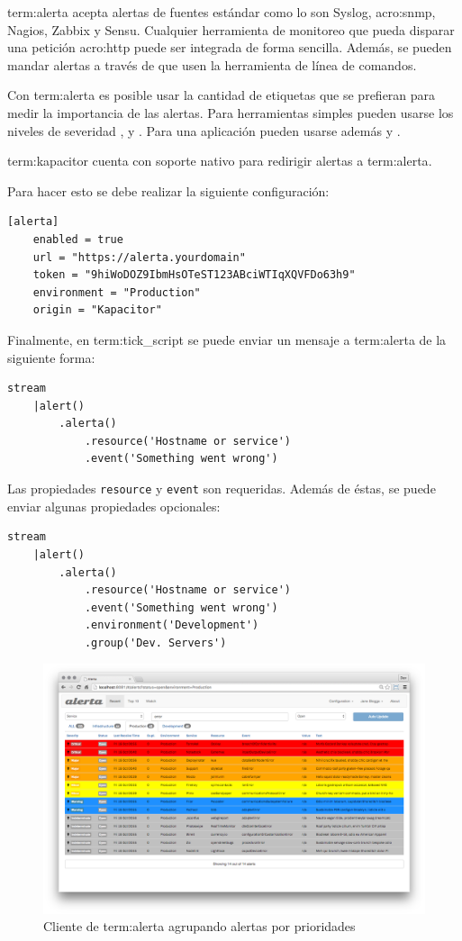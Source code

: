 \gls{term:alerta} acepta alertas de fuentes estándar como lo son Syslog,
\gls{acro:snmp}, Nagios, Zabbix y Sensu. Cualquier herramienta de monitoreo que
pueda disparar una petición \gls{acro:http} puede ser integrada de forma
sencilla. Además, se pueden mandar alertas a través de  que usen la
herramienta de línea de comandos.

Con \gls{term:alerta} es posible usar la cantidad de etiquetas que se prefieran
para medir la importancia de las alertas. Para herramientas simples pueden
usarse los niveles de severidad ,  y . Para
una aplicación pueden usarse además  y .

\gls{term:kapacitor} cuenta con soporte nativo para redirigir alertas a
\gls{term:alerta}.

Para hacer esto se debe realizar la siguiente configuración:

\begin{lstlisting}
[alerta]
    enabled = true
    url = "https://alerta.yourdomain"
    token = "9hiWoDOZ9IbmHsOTeST123ABciWTIqXQVFDo63h9"
    environment = "Production"
    origin = "Kapacitor"
\end{lstlisting}

Finalmente, en \gls{term:tick_script} se puede enviar un mensaje a
\gls{term:alerta} de la siguiente forma:

\begin{lstlisting}
stream
    |alert()
        .alerta()
            .resource('Hostname or service')
            .event('Something went wrong')
\end{lstlisting}

Las propiedades \lstinline{resource} y \lstinline{event} son requeridas. Además
de éstas, se puede enviar algunas propiedades opcionales:

\begin{lstlisting}
stream
    |alert()
        .alerta()
            .resource('Hostname or service')
            .event('Something went wrong')
            .environment('Development')
            .group('Dev. Servers')
\end{lstlisting}


\begin{figure}
  \includegraphics[width=\linewidth]{src/images/06-capitulo-6/alerta.png}
  \caption{Cliente de \gls{term:alerta} agrupando alertas por prioridades}
  \label{fig:alerta}
\end{figure}

